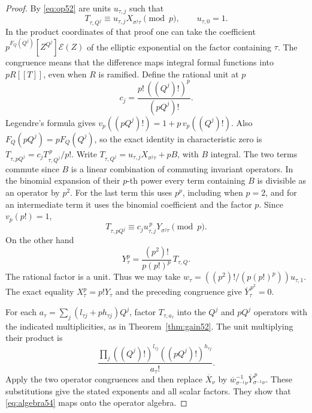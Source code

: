 \documentclass[a4paper,11pt]{article}
\theoremstyle{definition}
\theoremstyle{remark}
\numberwithin{equation}{section}
\begin{document}
\begin{proof}
By \eqref{eq:op52} are units \(u_{\tau,j}\) such that
\[
            T_{\tau,Q^j}\equiv u_{\tau,j}X_{\sigma^j\tau}
                                \pmod {p},\qquad u_{\tau,0}=1 .
\]
In the product coordinates of that proof one can take the coefficient
\(p^{F_Q(Q^j)}[Z^{Q^j}]\mathcal E(Z)\) of the elliptic exponential
on the factor containing \(\tau\). The congruence means that the
difference maps integral formal functions into \(pR[[T]]\), even
when \(R\) is ramified. Define the rational unit at \(p\)
\[
            c_j=\frac{p!\,((Q^j)!)^p}{(pQ^j)!}.
\]
Legendre's formula gives
\(v_p((pQ^j)!)=1+p\,v_p((Q^j)!)\). Also
\(F_Q(pQ^j)=pF_Q(Q^j)\), so the exact identity in characteristic
zero is \(T_{\tau,pQ^j}=c_j T_{\tau,Q^j}^{\,p}/p!\).
Write \(T_{\tau,Q^j}=u_{\tau,j}X_{\sigma^j\tau}+pB\), with \(B\)
integral. The two terms commute since \(B\) is a linear combination
of commuting invariant operators. In the binomial expansion of
their \(p\)-th power every term containing \(B\) is divisible as
an operator by \(p^2\). For the last term this uses \(p^p\),
including when \(p=2\), and for an intermediate term it uses the
binomial coefficient and the factor \(p\). Since \(v_p(p!)=1\),
\begin{equation}
            T_{\tau,pQ^j}\equiv
            c_j u_{\tau,j}^{\,p}Y_{\sigma^j\tau}\pmod p .
                                                            \label{eq:high54}
\end{equation}
On the other hand
\[
        Y_\tau^p=\frac{(p^2)!}{p(p!)^p}\,T_{\tau,Q}.
\]
The rational factor is a unit. Thus we may take
\(w_\tau=((p^2)!/(p(p!)^p))u_{\tau,1}\).
The exact equality \(X_\tau^p=p!Y_\tau\) and the preceding
congruence give \(\overline Y_\tau^{\,p^2}=0\).

For each \(a_\tau=\sum_j(l_{\tau j}+p h_{\tau j})Q^j\), factor
\(T_{\tau,a_\tau}\) into the \(Q^j\) and \(pQ^j\) operators with
the indicated multiplicities, as in Theorem~\ref{thm:gain52}.
The unit multiplying their product is
\[
      \frac{\prod_j ((Q^j)!)^{l_{\tau j}}
                          ((pQ^j)!)^{h_{\tau j}}}{a_\tau!}.
\]
Apply the two operator congruences and then replace
\(\overline X_\nu\) by
\(\overline w_{\sigma^{-1}\nu}^{-1}\overline Y_{\sigma^{-1}\nu}^{\,p}\).
These substitutions give the stated exponents and all scalar factors.
They show that \eqref{eq:algebra54} maps onto the operator algebra.


\end{proof}
\end{document}
